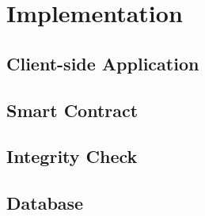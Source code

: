 \section{Implementation}
\label{sec:approach-implementation}

	\subsection{Client-side Application}
	\label{subsec:approach-implementation-client}

	\subsection{Smart Contract}
	\label{subsec:approach-implementation-client}

	\subsection{Integrity Check}
	\label{subsec:approach-implementation-client}

	\subsection{Database}
	\label{subsec:approach-implementation-client}
